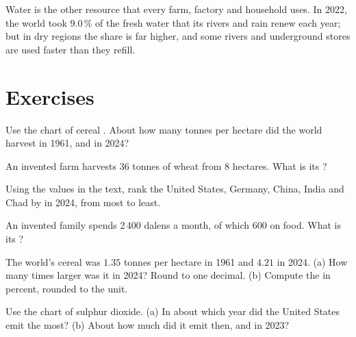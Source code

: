 Water is the other resource that every farm, factory and household uses. In
2022, the world took $9.0\,\%$ of the fresh water that its rivers and rain renew
each year; but in dry regions the share is far higher, and some rivers and
underground stores are used faster than they refill.

\section{Exercises}

\begin{exercise}[$\star$]\label{exo:g6:food-and-energy:1}
Use the chart of cereal . About how many tonnes per hectare did the world
harvest in 1961, and in 2024?
\end{exercise}

\begin{exercise}[$\star$]\label{exo:g6:food-and-energy:2}
An invented farm harvests 36 tonnes of wheat from 8 hectares. What is its ?
\end{exercise}

\begin{exercise}[$\star$]\label{exo:g6:food-and-energy:3}
Using the values in the text, rank the United States, Germany, China, India and
Chad by  in 2024, from most to least.
\end{exercise}

\begin{exercise}[$\star$]\label{exo:g6:food-and-energy:4}
An invented family spends 2\,400 dalens a month, of which 600 on food. What is its
?
\end{exercise}

\begin{exercise}[$\star\star$]\label{exo:g6:food-and-energy:5}
The world's cereal  was $1.35$ tonnes per hectare in 1961 and $4.21$ in 2024.
(a) How many times larger was it in 2024? Round to one decimal. (b) Compute the
 in percent, rounded to the unit.
\end{exercise}

\begin{exercise}[$\star\star$]\label{exo:g6:food-and-energy:6}
Use the chart of sulphur dioxide. (a) In about which year did the United States
emit the most? (b) About how much did it emit then, and in 2023?
\end{exercise}

